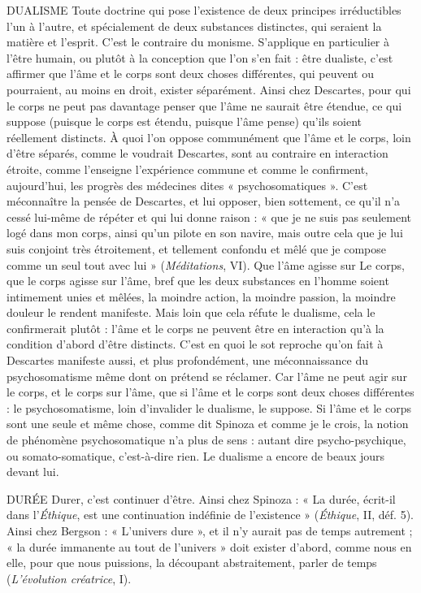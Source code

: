 DUALISME Toute doctrine qui pose l’existence de deux principes irréductibles
l’un à l’autre, et spécialement de deux substances distinctes,
qui seraient la matière et l’esprit. C’est le contraire du monisme.
S’applique en particulier à l’être humain, ou plutôt à la conception que l’on
s’en fait : être dualiste, c’est affirmer que l’âme et le corps sont deux choses différentes,
qui peuvent ou pourraient, au moins en droit, exister séparément.
Ainsi chez Descartes, pour qui le corps ne peut pas davantage penser que l’âme
ne saurait être étendue, ce qui suppose (puisque le corps est étendu, puisque
l’âme pense) qu’ils soient réellement distincts. À quoi l’on oppose communément
que l’âme et le corps, loin d’être séparés, comme le voudrait Descartes,
sont au contraire en interaction étroite, comme l’enseigne l’expérience commune
et comme le confirment, aujourd’hui, les progrès des médecines dites
« psychosomatiques ». C’est méconnaître la pensée de Descartes, et lui
opposer, bien sottement, ce qu’il n’a cessé lui-même de répéter et qui lui donne
raison : « que je ne suis pas seulement logé dans mon corps, ainsi qu’un pilote
en son navire, mais outre cela que je lui suis conjoint très étroitement, et tellement
confondu et mêlé que je compose comme un seul tout avec lui » ({\it Méditations}, VI).
Que l'âme agisse sur Le corps, que le corps agisse sur l’âme, bref que
les deux substances en l’homme soient intimement unies et mêlées, la moindre
action, la moindre passion, la moindre douleur le rendent manifeste. Mais loin
que cela réfute le dualisme, cela le confirmerait plutôt : l’âme et le corps ne
peuvent être en interaction qu’à la condition d’abord d’être distincts. C’est en
quoi le sot reproche qu’on fait à Descartes manifeste aussi, et plus profondément,
une méconnaissance du psychosomatisme même dont on prétend se
réclamer. Car l’âme ne peut agir sur le corps, et le corps sur l’âme, que si l’âme
et le corps sont deux choses différentes : le psychosomatisme, loin d’invalider le
dualisme, le suppose. Si l’âme et le corps sont une seule et même chose, comme
dit Spinoza et comme je le crois, la notion de phénomène psychosomatique n’a
plus de sens : autant dire psycho-psychique, ou somato-somatique, c’est-à-dire
rien. Le dualisme a encore de beaux jours devant lui.

DURÉE  Durer, c’est continuer d’être. Ainsi chez Spinoza : « La durée, écrit-il
dans l’{\it Éthique}, est une continuation indéfinie de l'existence »
({\it Éthique}, II, déf. 5). Ainsi chez Bergson : « L'univers dure », et il n’y aurait pas
de temps autrement ; « la durée immanente au tout de l’univers » doit exister
d’abord, comme nous en elle, pour que nous puissions, la découpant abstraitement,
parler de temps ({\it L'évolution créatrice}, I).

